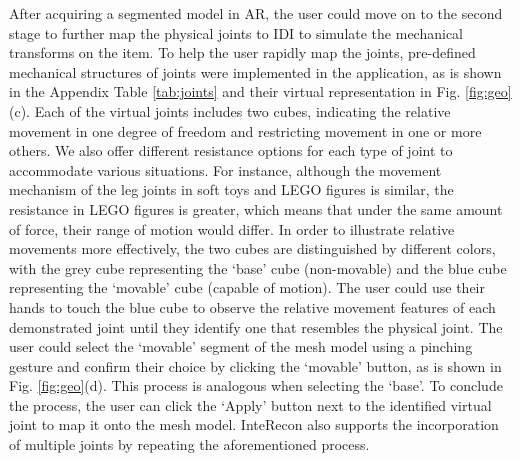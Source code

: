 After acquiring a segmented model in AR, the user could move on to the second stage to further map the physical joints to IDI to simulate the mechanical transforms on the item.
To help the user rapidly map the joints, pre-defined mechanical structures of joints \cite{blake1985design} were implemented in the application, as is shown in the Appendix Table \ref{tab:joints} and their virtual representation in Fig. \ref{fig:geo}(c).
Each of the virtual joints includes two cubes, indicating the relative movement in one degree of freedom and restricting movement in one or more others. 
We also offer different resistance options for each type of joint to accommodate various situations. For instance, although the movement mechanism of the leg joints in soft toys and LEGO figures is similar, the resistance in LEGO figures is greater, which means that under the same amount of force, their range of motion would differ. In order to illustrate relative movements more effectively, the two cubes are distinguished by different colors, with the grey cube representing the `base' cube (non-movable) and the blue cube representing the `movable' cube (capable of motion).
The user could use their hands to touch the blue cube to observe the relative movement features of each demonstrated joint until they identify one that resembles the physical joint.
The user could select the `movable' segment of the mesh model using a pinching gesture and confirm their choice by clicking the `movable' button, as is shown in Fig. \ref{fig:geo}(d).
This process is analogous when selecting the `base'.
To conclude the process, the user can click the `Apply' button next to the identified virtual joint to map it onto the mesh model.
InteRecon also supports the incorporation of multiple joints by repeating the aforementioned process. 


